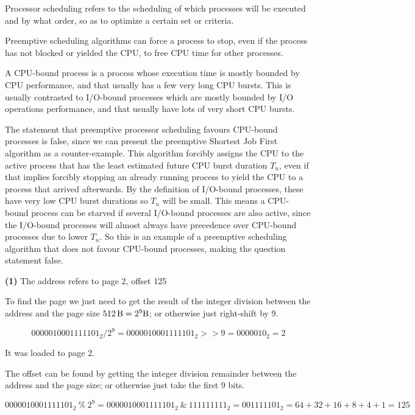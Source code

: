 \documentclass{sope}
\begin{document}
Processor scheduling refers to the scheduling of which processes will be executed and by what order, so as to optimize a certain set or criteria.

Preemptive scheduling algorithms can force a process to stop, even if the process has not blocked or yielded the CPU, to free CPU time for other processes.

A CPU-bound process is a process whose execution time is mostly bounded by CPU performance, and that usually has a few very long CPU bursts. This is usually contrasted to I/O-bound processes which are mostly bounded by I/O operations performance, and that usually have lots of very short CPU bursts.

The statement that preemptive processor scheduling favours CPU-bound processes is false, since we can present the preemptive Shortest Job First algorithm as a counter-example. This algorithm forcibly assigns the CPU to the active process that has the least estimated future CPU burst duration $T_n$, even if that implies forcibly stopping an already running process to yield the CPU to a process that arrived afterwards. By the definition of I/O-bound processes, these have very low CPU burst durations so $T_n$ will be small. This means a CPU-bound process can be starved if several I/O-bound processes are also active, since the I/O-bound processes will almost always have precedence over CPU-bound processes due to lower $T_n$. So this is an example of a preemptive scheduling algorithm that does not favour CPU-bound processes, making the question statement false.

\textbf{(1)} The address refers to page 2, offset 125

To find the page we just need to get the result of the integer division between the address and the page size $\SI{512}{\byte}=2^9\SI{}{\byte}$; or otherwise just right-shift by 9.

\begin{equation*}
    0000010001111101_2 / 2^9 = 0000010001111101_2 >> 9 = 0000010_2 = 2
\end{equation*}

It was loaded to page 2.

The offset can be found by getting the integer division remainder between the address and the page size; or otherwise just take the first 9 bits.

\begin{equation*}
    0000010001111101_2~\%~2^9 = 0000010001111101_2~\&~111111111_2 = 001111101_2 = 64+32+16+8+4+1 = 125 
\end{equation*}
\end{document}
